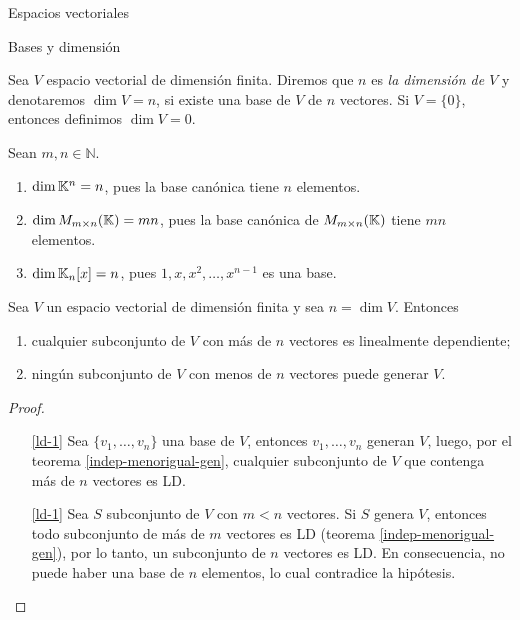 \begin{chapter}{Espacios vectoriales}
\begin{section}{Bases y dimensi\'on}
\begin{definicion}
    Sea $V$ espacio vectorial de dimensión finita. Diremos que $n$  es \textit{la dimensión de $V$} y  denotaremos $\dim V =n$,  si existe una base de $V$  de $n$  vectores. Si $V = \{0\}$,  entonces definimos $\dim V =0$.
\end{definicion}





\begin{ejemplo*} Sean $m,n \in \mathbb N$. 
    \begin{enumerate}
        \item $\dim \mathbb K^n= n$, pues  la base canónica tiene $n$ elementos.
        \item $\dim M_{m \times n}(\mathbb K) = mn$, pues la base canónica de $M_{m \times n}(\mathbb K)$ tiene $mn$  elementos.  
        \item $\dim \mathbb K_n[x] =n$, pues $1,x,x^2,\ldots,x^{n-1}$ es una base.   
    \end{enumerate}
\end{ejemplo*}
        
        
        \begin{corolario}
            Sea $V$ un espacio vectorial de dimensión finita y sea $n = \dim V$. 
            Entonces
            \begin{enumerate}
                \item\label{ld-1} cualquier subconjunto de $V$ con más de $n$ vectores es linealmente
                dependiente;
                \item\label{ld-2} ningún subconjunto de $V$ con menos de $n$ vectores puede generar $V$.
            \end{enumerate} 
        \end{corolario}
    \begin{proof}

        \
        
        \begin{enumerate}
            \item[\ref{ld-1}] Sea $\{v_1,\ldots,v_n\}$ una base de $V$, entonces $v_1,\ldots,v_n$ generan $V$, luego, por el teorema \ref{indep-menorigual-gen}, cualquier subconjunto de $V$ que contenga más de $n$ vectores es LD.
            \item[\ref{ld-1}] Sea $S$  subconjunto de $V$ con $m < n$ vectores. Si $S$  genera $V$,  entonces todo subconjunto de más de $m$  vectores es LD (teorema \ref{indep-menorigual-gen}), por lo tanto, un subconjunto de $n$ vectores es LD. En  consecuencia, no puede haber una base de $n$  elementos, lo cual contradice la hipótesis.
        \end{enumerate} 
    \end{proof}


\end{section}
\end{chapter}

